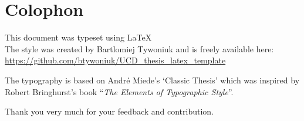 \pagestyle{empty}

\hfill

\vfill


\section*{Colophon}
This document was typeset using \LaTeX \\

The style was created by Bartlomiej Tywoniuk and is freely available here: \\
\url{https://github.com/btywoniuk/UCD_thesis_latex_template}

The typography is based on André Miede's `Classic Thesis' 
which was inspired by Robert Bringhurst's book ``\emph{The Elements of Typographic Style}''.

Thank you very much for your feedback and contribution.

\bigskip

\noindent

